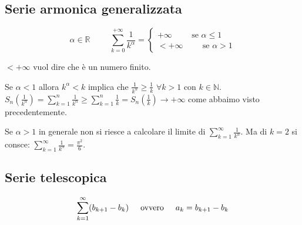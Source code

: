\subsection*{Serie armonica generalizzata}
$$\alpha\in\mathbb{R}\hspace{1cm}\sum^{+\infty}_{k=0}\frac{1}{k^\alpha}=\begin{cases}
+\infty\hspace{1cm}\text{se }\alpha\leq1\\
<+\infty\hspace{1cm}\text{se }\alpha>1
\end{cases}$$

\begin{notation*}
$<+\infty$ vuol dire che è un numero finito.
\end{notation*}

Se $\alpha<1$ allora $k^\alpha<k$ implica che $\frac{1}{k^\alpha}\geq\frac{1}{k}$ $\forall k>1$ con $k\in\mathbb{N}$. $S_n(\frac{1}{k^\alpha})=\sum^n_{k=1}\frac{1}{k^\alpha}\geq\sum^n_{k=1}\frac{1}{k}=S_n(\frac{1}{k})\to+\infty$ come abbaimo visto precedentemente.

\begin{osservation*}
    Se $\alpha>1$ in generale non si riesce a calcolare il limite di $\sum^\infty_{k=1}\frac{1}{k^\alpha}$. Ma di $k=2$ si consce: $\sum^\infty_{k=1}\frac{1}{k^\alpha}=\frac{\pi^2}{6}$.
\end{osservation*}

\subsection*{Serie telescopica}
\begin{equation*}
    \sum^\infty_{k=1}(b_{k+1}-b_k)\hspace{0.5cm}\text{ovvero}\hspace{0.5cm}a_k=b_{k+1}-b_k
\end{equation*}

